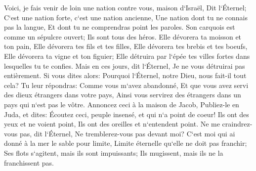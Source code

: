 \verse Voici, je fais venir de loin une nation contre vous, maison d`Israël, Dit l`Éternel; C`est une nation forte, c`est une nation ancienne, Une nation dont tu ne connais pas la langue, Et dont tu ne comprendras point les paroles. 
\verse Son carquois est comme un sépulcre ouvert; Ils sont tous des héros. 
\verse Elle dévorera ta moisson et ton pain, Elle dévorera tes fils et tes filles, Elle dévorera tes brebis et tes boeufs, Elle dévorera ta vigne et ton figuier; Elle détruira par l`épée tes villes fortes dans lesquelles tu te confies. 
\verse Mais en ces jours, dit l`Éternel, Je ne vous détruirai pas entièrement. 
\verse Si vous dites alors: Pourquoi l`Éternel, notre Dieu, nous fait-il tout cela? Tu leur répondras: Comme vous m`avez abandonné, Et que vous avez servi des dieux étrangers dans votre pays, Ainsi vous servirez des étrangers dans un pays qui n`est pas le vôtre. 
\verse Annoncez ceci à la maison de Jacob, Publiez-le en Juda, et dites: 
\verse Écoutez ceci, peuple insensé, et qui n`a point de coeur! Ils ont des yeux et ne voient point, Ils ont des oreilles et n`entendent point. 
\verse Ne me craindrez-vous pas, dit l`Éternel, Ne tremblerez-vous pas devant moi? C`est moi qui ai donné à la mer le sable pour limite, Limite éternelle qu`elle ne doit pas franchir; Ses flots s`agitent, mais ils sont impuissants; Ils mugissent, mais ils ne la franchissent pas. 
